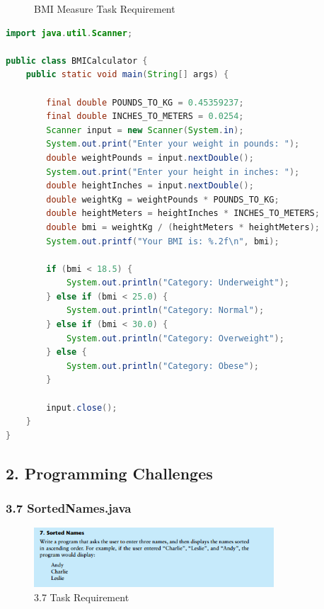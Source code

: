\documentclass{article}
\begin{document}
\begin{figure}[h]
    \centering
    \caption{BMI Measure Task Requirement}
\end{figure}

\begin{lstlisting}[language=Java, caption=BMICalculator.java]
import java.util.Scanner;

public class BMICalculator {
    public static void main(String[] args) {
        
        final double POUNDS_TO_KG = 0.45359237;
        final double INCHES_TO_METERS = 0.0254;
        Scanner input = new Scanner(System.in);
        System.out.print("Enter your weight in pounds: ");
        double weightPounds = input.nextDouble();
        System.out.print("Enter your height in inches: ");
        double heightInches = input.nextDouble();
        double weightKg = weightPounds * POUNDS_TO_KG;
        double heightMeters = heightInches * INCHES_TO_METERS;
        double bmi = weightKg / (heightMeters * heightMeters);
        System.out.printf("Your BMI is: %.2f\n", bmi);

        if (bmi < 18.5) {
            System.out.println("Category: Underweight");
        } else if (bmi < 25.0) {
            System.out.println("Category: Normal");
        } else if (bmi < 30.0) {
            System.out.println("Category: Overweight");
        } else {
            System.out.println("Category: Obese");
        }

        input.close();
    }
}
\end{lstlisting}

\subsection*{2. Programming Challenges}

\subsubsection*{3.7 SortedNames.java}
\begin{figure}[H]
    \centering
    \includegraphics[width=0.8\textwidth]{./Assets/Task requirements/Assignment3/3.7.png}
    \caption{3.7 Task Requirement}
\end{figure}
\end{document}
